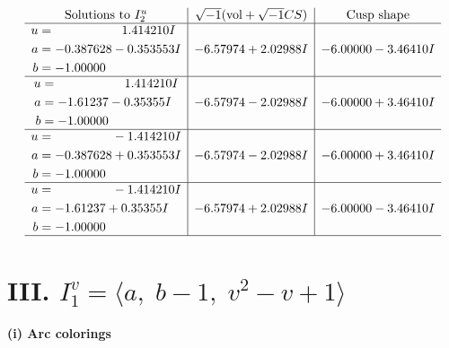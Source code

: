\documentclass[1p]{elsarticle_modified}
\theoremstyle{definition}
\newcommand{\I}{\sqrt{-1}}
\begin{document}
$$\begin{array}{c|c|c}  
\text{Solutions to }I^u_{2}& \I (\text{vol} + \sqrt{-1}CS) & \text{Cusp shape}\\
 \hline 
\begin{aligned}
u &= \phantom{-0.000000 -}1.414210 I \\
a &= -0.387628 - 0.353553 I \\
b &= -1.00000\phantom{ +0.000000I}\end{aligned}
 & -6.57974 + 2.02988 I & -6.00000 - 3.46410 I \\ \hline\begin{aligned}
u &= \phantom{-0.000000 -}1.414210 I \\
a &= -1.61237 - 0.35355 I \\
b &= -1.00000\phantom{ +0.000000I}\end{aligned}
 & -6.57974 - 2.02988 I & -6.00000 + 3.46410 I \\ \hline\begin{aligned}
u &= \phantom{-0.000000 } -1.414210 I \\
a &= -0.387628 + 0.353553 I \\
b &= -1.00000\phantom{ +0.000000I}\end{aligned}
 & -6.57974 - 2.02988 I & -6.00000 + 3.46410 I \\ \hline\begin{aligned}
u &= \phantom{-0.000000 } -1.414210 I \\
a &= -1.61237 + 0.35355 I \\
b &= -1.00000\phantom{ +0.000000I}\end{aligned}
 & -6.57974 + 2.02988 I & -6.00000 - 3.46410 I\\
 \hline 
 \end{array}$$\newpage\newpage\renewcommand{\arraystretch}{1}
\centering \section*{III. $I^v_{1}= \langle a,\;b-1,\;v^2- v+1 \rangle$}
\flushleft \textbf{(i) Arc colorings}\\
\end{document}
